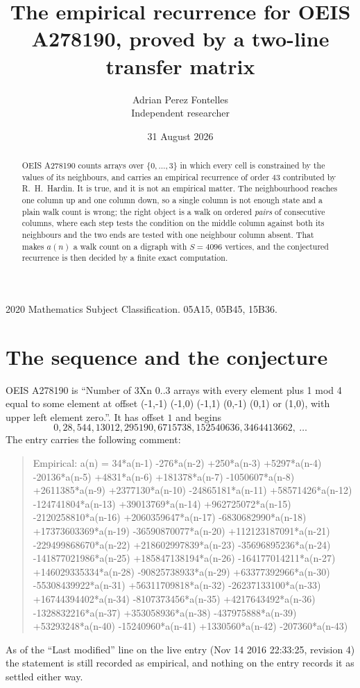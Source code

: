 \documentclass[11pt,a4paper]{article}
\title{The empirical recurrence for OEIS A278190, proved by a two-line transfer matrix}
\author{Adrian Perez Fontelles\\ \small Independent researcher}
\date{31 August 2026}
\theoremstyle{plain}
\theoremstyle{definition}
\begin{document}
\maketitle

\begin{abstract}
OEIS A278190 counts arrays over $\{0,\dots,3\}$ in which every cell is constrained by the
values of its neighbours, and carries an empirical recurrence of order $43$ contributed
by R.~H.~Hardin. It is true, and it is not an empirical matter. The neighbourhood reaches one
column up and one column down, so a single column is not enough state and a plain walk count
is wrong; the right object is a walk on ordered \emph{pairs} of consecutive columns, where
each step tests the condition on the middle column against both its neighbours and the two
ends are tested with one neighbour column absent. That makes $a(n)$ a walk count on a digraph
with $S=4096$ vertices, and the conjectured recurrence is then decided by a finite exact
computation.
\end{abstract}

\noindent\small 2020 Mathematics Subject Classification. 05A15, 05B45, 15B36.\normalsize

\section{The sequence and the conjecture}

OEIS A278190 is ``Number of 3Xn 0..3 arrays with every element plus 1 mod 4 equal to some element at offset (-1,-1) (-1,0) (-1,1) (0,-1) (0,1) or (1,0), with upper left element zero.''. It has offset $1$ and begins
\[
0, 28, 544, 13012, 295190, 6715738, 152540636, 3464413662,\ \dots
\]
The entry carries the following comment:
\begin{quote}\small
Empirical: a(n) = 34*a(n-1) -276*a(n-2) +250*a(n-3) +5297*a(n-4) -20136*a(n-5) +4831*a(n-6) +181378*a(n-7) -1050607*a(n-8) +2611385*a(n-9) +2377130*a(n-10) -24865181*a(n-11) +58571426*a(n-12) -124741804*a(n-13) +39013769*a(n-14) +962725072*a(n-15) -2120258810*a(n-16) +2060359647*a(n-17) -6830682990*a(n-18) +17373603369*a(n-19) -36590870077*a(n-20) +112123187091*a(n-21) -229499868670*a(n-22) +218602997839*a(n-23) -35696895236*a(n-24) -141877021986*a(n-25) +185847138194*a(n-26) -164177014211*a(n-27) +146029335334*a(n-28) -90825738933*a(n-29) +63377392966*a(n-30) -55308439922*a(n-31) +56311709818*a(n-32) -26237133100*a(n-33) +16744394402*a(n-34) -8107373456*a(n-35) +4217643492*a(n-36) -1328832216*a(n-37) +353058936*a(n-38) -437975888*a(n-39) +53293248*a(n-40) -15240960*a(n-41) +1330560*a(n-42) -207360*a(n-43)
\end{quote}
As of the ``Last modified'' line on the live entry (Nov 14 2016 22:33:25, revision 4) the statement is
still recorded as empirical, and nothing on the entry records it as settled either way.
\end{document}
